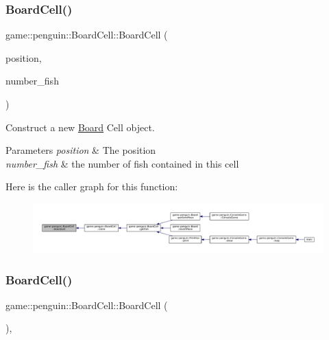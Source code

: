 \subsubsection{\texorpdfstring{Board\+Cell()}{BoardCell()}\hspace{0.1cm}{\footnotesize\ttfamily [1/2]}}
{\footnotesize\ttfamily game\+::penguin\+::\+Board\+Cell\+::\+Board\+Cell (\begin{DoxyParamCaption}\item[{const \hyperlink{structgame_1_1_position}{Position} \&}]{position,  }\item[{unsigned int}]{number\+\_\+fish }\end{DoxyParamCaption})\hspace{0.3cm}{\ttfamily [explicit]}}



Construct a new \hyperlink{classgame_1_1penguin_1_1_board}{Board} Cell object. 


\begin{DoxyParams}{Parameters}
{\em position} & The position \\
\hline
{\em number\+\_\+fish} & the number of fish contained in this cell \\
\hline
\end{DoxyParams}
Here is the caller graph for this function\+:
\nopagebreak
\begin{figure}[H]
\begin{center}
\leavevmode
\includegraphics[width=350pt]{classgame_1_1penguin_1_1_board_cell_a2c76e638f5d0d4374b422756b08cb61f_icgraph}
\end{center}
\end{figure}
\mbox{\label{classgame_1_1penguin_1_1_board_cell_a5637880645cc7230fa2091aee3588bed}} 
\subsubsection{\texorpdfstring{Board\+Cell()}{BoardCell()}\hspace{0.1cm}{\footnotesize\ttfamily [2/2]}}
{\footnotesize\ttfamily game\+::penguin\+::\+Board\+Cell\+::\+Board\+Cell (\begin{DoxyParamCaption}\item[{const \hyperlink{classgame_1_1penguin_1_1_board_cell}{Board\+Cell} \&}]{ }\end{DoxyParamCaption})\hspace{0.3cm}{\ttfamily [explicit]}, {\ttfamily [delete]}}



